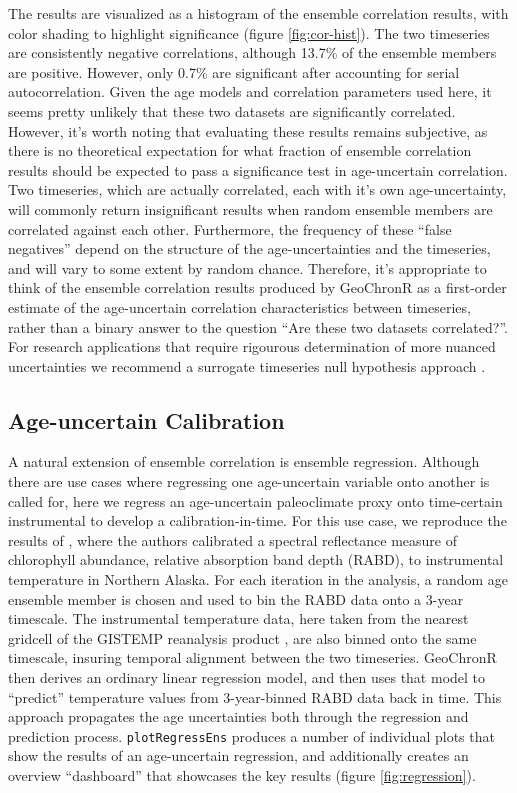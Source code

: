 \documentclass[gc, manuscript]{copernicus}
\begin{document}
The results are visualized as a histogram of the ensemble correlation results, with color shading to highlight significance (figure \ref{fig:cor-hist}).
The two timeseries are consistently negative correlations, although 13.7\% of the ensemble members are positive.
However, only 0.7\% are significant after accounting for serial autocorrelation.
Given the age models and correlation parameters used here, it seems pretty unlikely that these two datasets are significantly correlated.
However, it's worth noting that evaluating these results remains subjective, as there is no theoretical expectation for what fraction of ensemble correlation results should be expected to pass a significance test in age-uncertain correlation.
Two timeseries, which are actually correlated, each with it's own age-uncertainty, will commonly return insignificant results when random ensemble members are correlated against each other.
Furthermore, the frequency of these ``false negatives'' depend on the structure of the age-uncertainties and the timeseries, and will vary to some extent by random chance.
Therefore, it's appropriate to think of the ensemble correlation results produced by GeoChronR as a first-order estimate of the age-uncertain correlation characteristics between timeseries, rather than a binary answer to the question ``Are these two datasets correlated?''.
For research applications that require rigourous determination of more nuanced uncertainties we recommend a surrogate timeseries null hypothesis approach \citep[e.g.][others?]{mckay2018onset}.

\subsection{Age-uncertain Calibration}

A natural extension of ensemble correlation is ensemble regression.
Although there are use cases where regressing one age-uncertain variable onto another is called for, here we regress an age-uncertain paleoclimate proxy onto time-certain instrumental to develop a calibration-in-time.
For this use case, we reproduce the results of \citet{Boldt:2015}, where the authors calibrated a spectral reflectance measure of chlorophyll abundance, relative absorption band depth (RABD), to instrumental temperature in Northern Alaska.
For each iteration in the analysis, a random age ensemble member is chosen and used to bin the RABD data onto a 3-year timescale.
The instrumental temperature data, here taken from the nearest gridcell of the GISTEMP reanalysis product \citep{GISTEMP}, are also binned onto the same timescale, insuring temporal alignment between the two timeseries.
GeoChronR then derives an ordinary linear regression model, and then uses that model to ``predict'' temperature values from 3-year-binned RABD data back in time.
This approach propagates the age uncertainties both through the regression and prediction process.
\texttt{plotRegressEns} produces a number of individual plots that show the results of an age-uncertain regression, and additionally creates an overview ``dashboard'' that showcases the key results (figure \ref{fig:regression}).
\end{document}

